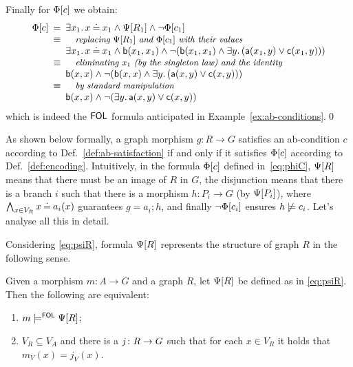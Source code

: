 \begin{example}
\medskip\noindent
Finally for $\Phi[{c}]$ we obtain:
\[\begin{array}{l@{{\enspace}}c@{{\enspace}}l}
\tofol {c}
 & = & \exists x_1\st x \Eq x_1 \land  \grtofol {R_1} \land \neg \tofol {c_1} \\
 & \equiv & \text{\emph{\small replacing $\grtofol {R_1}$ and $\tofol {c_1}$ with their values}} \\
 && \exists x_1\st x \Eq x_1 \land \lb(x_1,x_1) \land  \neg (\lb(x_1,x_1)\land \exists y \st (\la(x_1,y) \lor \lc(x_1,y)))\\
 & \equiv & \text{\emph{\small eliminating $x_1$ (by the singleton law) and the identity}} \\
 && \lb(x,x) \land \neg (\lb(x,x)\land \exists y\st  (\la(x,y) \lor \lc(x,y)))\\
 & \equiv & \text{\emph{\small by standard manipulation}}\\
 && \lb(x,x) \land \neg (\exists y \st \la(x,y) \lor \lc(x,y))\\
\end{array}\]
%
which is indeed the $\mathsf{FOL}$ formula anticipated in Example~\ref{ex:ab-conditions}.\qed
\end{example}
%
As shown below formally, a graph morphism $g: R \to G$ satisfies an ab-condition $c$ according to Def.~\ref{def:ab-satisfaction} if and only if it satisfies $\Phi[{c}]$ according to Def.~\ref{def:encoding}. Intuitively, in the formula $\Phi[{c}]$ defined in~\eqref{eq:phiC}, $\Psi[{R}]$ means that there must be an image of $R$ in $G$, the disjunction means that there is a branch $i$ such that there is a morphism $h: P_i \to G$ (by $\Psi[{P_i}]$), where  $\bigwedge_{x \in V_{R}} x \mathbin{\doteq} a_i(x)$ guarantees $g=a_i;h$, and finally $\neg \Phi[{c_i}]$ ensures $h\not\models c_i$. Let's analyse all this in detail.


Considering \eqref{eq:psiR}, formula $\Psi[{R}]$ represents the structure of graph $R$ in the following sense.
\begin{lemma}
  \label{lem:psi-R}
Given a morphism $m: A \to G$ and a graph $R$, let $\Psi[{R}]$ be defined as in \eqref{eq:psiR}. Then the following are equivalent:
\begin{enumerate} 
  \item $m \models^{\mathsf{FOL}} \Psi[{R}]$;
  \item $V_R  \subseteq V_A$ and there is a $j \colon R \rightarrow G$ such that for each $x \in V_R$ it holds that $m_V(x) = j_V(x)$.
\end{enumerate}
\end{lemma}
 
